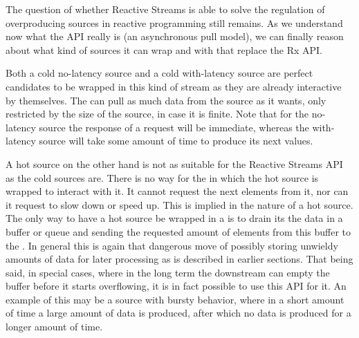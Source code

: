 The question of whether Reactive Streams is able to solve the regulation of overproducing sources in reactive programming still remains. As we understand now what the API really is (an asynchronous pull model), we can finally reason about what kind of sources it can wrap and with that replace the Rx API.

Both a cold no-latency source and a cold with-latency source are perfect candidates to be wrapped in this kind of stream as they are already interactive by themselves. The  can pull as much data from the source as it wants, only restricted by the size of the source, in case it is finite. Note that for the no-latency source the response of a request will be immediate, whereas the with-latency source will take some amount of time to produce its next  values.

A hot source on the other hand is not as suitable for the Reactive Streams API as the cold sources are. There is no way for the  in which the hot source is wrapped to interact with it. It cannot request the next  elements from it, nor can it request to slow down or speed up. This is implied in the nature of a hot source. The only way to have a hot source be wrapped in a  is to drain its the data in a buffer or queue and sending the requested amount of elements from this buffer to the . In general this is again that dangerous move of possibly storing unwieldy amounts of data for later processing as is described in earlier sections. That being said, in special cases, where in the long term the downstream can empty the buffer before it starts overflowing, it is in fact possible to use this API for it. An example of this may be a source with bursty behavior, where in a short amount of time a large amount of data is produced, after which no data is produced for a longer amount of time.



























